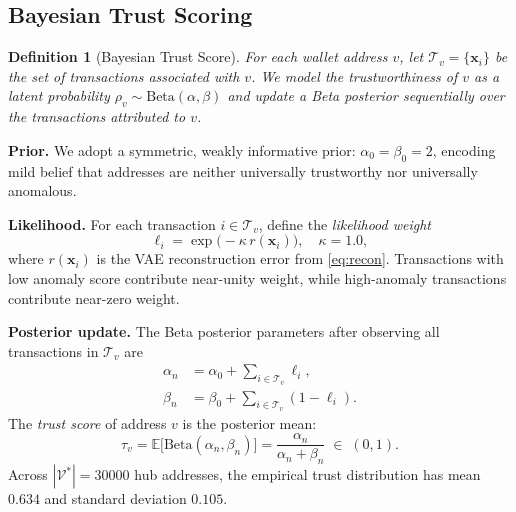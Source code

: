 \documentclass[journal]{IEEEtran}
\newtheorem{definition}{Definition}
\begin{document}
\subsection{Bayesian Trust Scoring}
\label{subsec:trust}

\begin{definition}[Bayesian Trust Score]
\label{def:trust}
For each wallet address $v$, let
$\mathcal{T}_{v} = \{\mathbf{x}_{i}\}$ be the set of transactions
associated with $v$.
We model the \emph{trustworthiness} of $v$ as a latent probability
$\rho_{v}\sim\mathrm{Beta}(\alpha,\beta)$ and update a Beta posterior
sequentially over the transactions attributed to $v$.
\end{definition}

\noindent\textbf{Prior.}
We adopt a symmetric, weakly informative prior:
$\alpha_{0} = \beta_{0} = 2$, encoding mild belief that addresses are
neither universally trustworthy nor universally anomalous.

\noindent\textbf{Likelihood.}
For each transaction $i\in\mathcal{T}_{v}$, define the \emph{likelihood
weight}
\begin{equation}
  \ell_{i}
    = \exp\!\bigl(-\kappa\,r(\mathbf{x}_{i})\bigr),
  \quad \kappa = 1.0,
  \label{eq:likelihood}
\end{equation}
where $r(\mathbf{x}_{i})$ is the VAE reconstruction error from
\eqref{eq:recon}.  Transactions with low anomaly score contribute near-unity
weight, while high-anomaly transactions contribute near-zero weight.

\noindent\textbf{Posterior update.}
The Beta posterior parameters after observing all transactions in
$\mathcal{T}_{v}$ are
\begin{align}
  \alpha_{n} &= \alpha_{0} + \textstyle\sum_{i\in\mathcal{T}_{v}} \ell_{i},
  \label{eq:alpha_n} \\
  \beta_{n}  &= \beta_{0}  + \textstyle\sum_{i\in\mathcal{T}_{v}} (1 - \ell_{i}).
  \label{eq:beta_n}
\end{align}
The \emph{trust score} of address $v$ is the posterior mean:
\begin{equation}
  \tau_{v}
    = \mathbb{E}\!\bigl[\mathrm{Beta}(\alpha_{n},\beta_{n})\bigr]
    = \frac{\alpha_{n}}{\alpha_{n} + \beta_{n}}
    \;\in\; (0,1).
  \label{eq:trust}
\end{equation}
Across $|\mathcal{V}^{*}|=\num{30000}$ hub addresses, the empirical trust
distribution has mean $0.634$ and standard deviation $0.105$.

\end{document}
